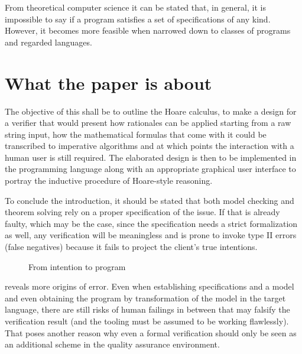 From theoretical computer science it can be stated that, in general, it is impossible to say if a program satisfies a set of specifications of any kind. However, it becomes more feasible when narrowed down to classes of programs and regarded languages.

\section{What the paper is about}
The objective of this \paper{} shall be to outline the Hoare calculus, to make a design for a verifier that would present how rationales can be applied starting from a raw string input, how the mathematical formulas that come with it could be transcribed to imperative algorithms and at which points the interaction with a human user is still required. The elaborated design is then to be implemented in the  programming language along with an appropriate graphical user interface to portray the inductive procedure of Hoare-style reasoning.

To conclude the introduction, it should be stated that both model checking and theorem solving rely on a proper specification of the issue. If that is already faulty, which may be the case, since the specification needs a strict formalization as well, any verification will be meaningless and is prone to invoke type II errors (false negatives) because it fails to project the client's true intentions.


\begin{figure}
	\centering
	
	
	
	\caption{From intention to program}
	\label{fig:taskToProgram}
\end{figure}

 reveals more origins of error. Even when establishing specifications and a model and even obtaining the program by transformation of the model in the target language, there are still risks of human failings in between that may falsify the verification result (and the tooling must be assumed to be working flawlessly). That poses another reason why even a formal verification should only be seen as an additional scheme in the quality assurance environment.

%

